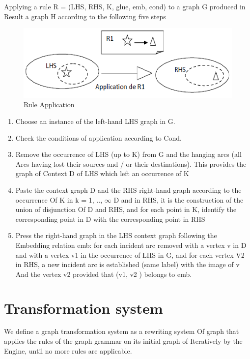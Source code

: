 Applying a rule R = (LHS, RHS, K, glue, emb, cond) to a graph G produced in
Result a graph H according to the following five steps

\begin{figure}[th]
	\centering
		\includegraphics[scale=0.9]{ch3/img/rules}
	\caption{\label{fig:Rule Application}Rule Application\cite{ch3-img}}
\end{figure} 

\begin{enumerate}
\item  Choose an instance of the left-hand LHS graph in G.
\item Check the conditions of application according to Cond.
\item Remove the occurrence of LHS (up to K) from G and the hanging arcs (all
Arcs having lost their sources and / or their destinations). This provides the graph of
Context D of LHS which left an occurrence of K
\item
Paste the context graph D and the RHS right-hand graph according to the occurrence
Of K in k = 1, .., $\infty$ D and in RHS, it is the construction of the union of disjunction
Of D and RHS, and for each point in K, identify the corresponding point in
D with the corresponding point in RHS
\item
Press the right-hand graph in the LHS context graph following the
Embedding relation emb: for each incident arc removed with a vertex v in
D and with a vertex v1 in the occurrence of LHS in G, and for each vertex
V2 in RHS, a new incident arc is established (same label) with the image of v
And the vertex v2 provided that (v1, v2 ) belongs to emb. 
\end{enumerate}


 
\section{ Transformation system } 

We define a graph transformation system as a rewriting system
Of graph that applies the rules of the graph grammar on its initial graph of
Iteratively by the Engine, until no more rules are applicable\cite{ch3-doc2,  ch3-doc}.

